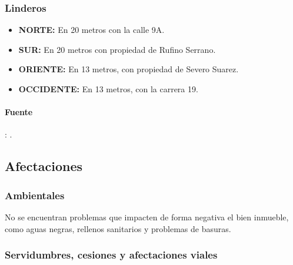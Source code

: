 \documentclass[12pt,a4paper,twoside]{article}
\begin{document}
\subsubsection{Linderos}

	
\begin{itemize}
	
	\item \textbf{NORTE:} En 20 metros con la calle 9A.\\
	\item \textbf{SUR:} En 20 metros con propiedad de Rufino Serrano. \\
	\item \textbf{ORIENTE:} En 13 metros, con propiedad de Severo Suarez.\\
	\item \textbf{OCCIDENTE:}  En 13 metros, con la carrera 19.\\
\end{itemize}




\paragraph{Fuente}: \EscrituraAportada.


\subsection{Afectaciones}

\subsubsection{Ambientales}

No se encuentran problemas que impacten de forma negativa el bien inmueble, como aguas negras, rellenos sanitarios y problemas de basuras.

\subsubsection{Servidumbres, cesiones y afectaciones viales}
\end{document}
